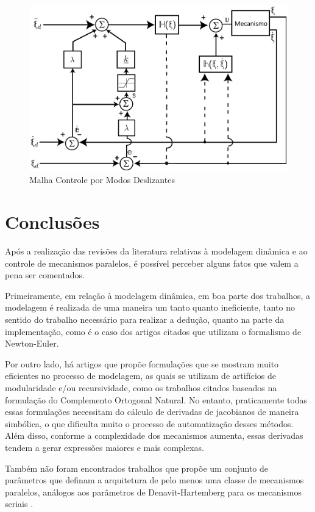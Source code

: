 \documentclass[]{politex}
\begin{document}
\begin{figure}[h]
	\centering
	\includegraphics[scale=0.55]{../figures/CMDnew.jpg}  
	\caption{Malha Controle por Modos Deslizantes}
	\label{fig:CMD}
\end{figure}

\section{Conclusões}

Após a realização das revisões da literatura relativas à modelagem dinâmica e ao controle de mecanismos paralelos, é possível perceber alguns fatos que valem a pena ser comentados.

Primeiramente, em relação à modelagem dinâmica, em boa parte dos trabalhos, a modelagem é realizada de uma maneira um tanto quanto ineficiente, tanto no sentido do trabalho necessário para realizar a dedução, quanto na parte da implementação, como é o caso dos artigos citados que utilizam o formalismo de Newton-Euler. 

Por outro lado, há artigos que propõe formulações que se mostram muito eficientes no processo de modelagem, as quais se utilizam de artifícios de modularidade e/ou recursividade, como os trabalhos citados baseados na formulação do Complemento Ortogonal Natural. No entanto, praticamente todas essas formulações necessitam do cálculo de derivadas de jacobianos de maneira simbólica, o que dificulta muito o processo de automatização desses métodos. Além disso, conforme a complexidade dos mecanismos aumenta, essas derivadas tendem a gerar expressões maiores e mais complexas.

Também não foram encontrados trabalhos que propõe um conjunto de parâmetros que definam a arquitetura de pelo menos uma classe de mecanismos paralelos, análogos aos parâmetros de Denavit-Hartemberg para os mecanismos seriais \cite{Denavit}.
\end{document}
